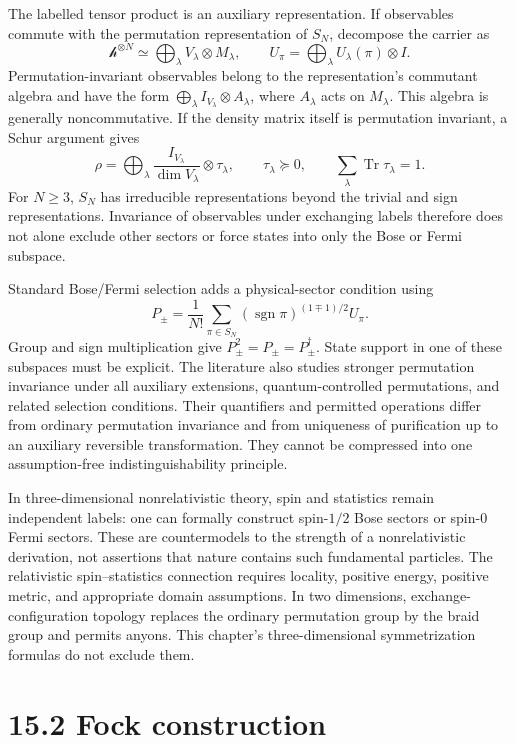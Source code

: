 \documentclass[
  11pt,
  oneside]{book}
\begin{document}
The labelled tensor product is an auxiliary representation. If
observables commute with the permutation representation of \(S_N\),
decompose the carrier as \[
\mathcal h^{\otimes N}\simeq\bigoplus_\lambda V_\lambda\otimes M_\lambda,
\qquad U_\pi=\bigoplus_\lambda U_\lambda(\pi)\otimes I.
\] Permutation-invariant observables belong to the representation's
commutant algebra and have the form
\(\bigoplus_\lambda I_{V_\lambda}\otimes A_\lambda\), where
\(A_\lambda\) acts on \(M_\lambda\). This algebra is generally
noncommutative. If the density matrix itself is permutation invariant, a
Schur argument gives \[
\rho=\bigoplus_\lambda\frac{I_{V_\lambda}}{\dim V_\lambda}\otimes\tau_\lambda,
\qquad \tau_\lambda\succeq0,\qquad\sum_\lambda\operatorname{Tr}\tau_\lambda=1.
\] For \(N\ge3\), \(S_N\) has irreducible representations beyond the
trivial and sign representations. Invariance of observables under
exchanging labels therefore does not alone exclude other sectors or
force states into only the Bose or Fermi subspace.

Standard Bose/Fermi selection adds a physical-sector condition using \[
P_\pm=\frac1{N!}\sum_{\pi\in S_N}
(\operatorname{sgn}\pi)^{(1\mp1)/2}U_\pi.
\] Group and sign multiplication give \(P_\pm^2=P_\pm=P_\pm^\dagger\).
State support in one of these subspaces must be explicit. The literature
also studies stronger permutation invariance under all auxiliary
extensions, quantum-controlled permutations, and related selection
conditions. Their quantifiers and permitted operations differ from
ordinary permutation invariance and from uniqueness of purification up
to an auxiliary reversible transformation. They cannot be compressed
into one assumption-free indistinguishability principle.

In three-dimensional nonrelativistic theory, spin and statistics remain
independent labels: one can formally construct spin-\(1/2\) Bose sectors
or spin-\(0\) Fermi sectors. These are countermodels to the strength of
a nonrelativistic derivation, not assertions that nature contains such
fundamental particles. The relativistic spin--statistics connection
requires locality, positive energy, positive metric, and appropriate
domain assumptions. In two dimensions, exchange-configuration topology
replaces the ordinary permutation group by the braid group and permits
anyons. This chapter's three-dimensional symmetrization formulas do not
exclude them.

\section{15.2 Fock construction}
\end{document}
